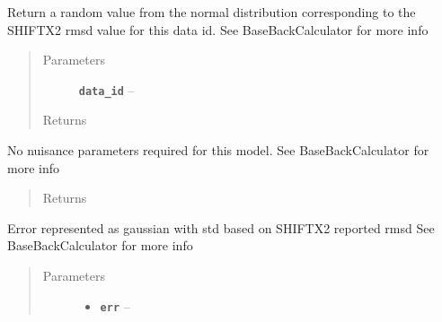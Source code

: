 \documentclass[letterpaper,10pt,english]{sphinxmanual}
\begin{document}
\begin{fulllineitems}

\begin{fulllineitems}
\label{modules:backcalc.ShiftBackCalc.get_random_err}
Return a random value from the normal distribution corresponding
to the SHIFTX2 rmsd value for this data id. See BaseBackCalculator
for more info
\begin{quote}\begin{description}
\item[{Parameters}] \leavevmode
\textbf{\texttt{data\_id}} -- 

\item[{Returns}] \leavevmode


\end{description}\end{quote}

\end{fulllineitems}


\begin{fulllineitems}
\label{modules:backcalc.ShiftBackCalc.get_random_params}
No nuisance parameters required for this model. See BaseBackCalculator
for more info
\begin{quote}\begin{description}
\item[{Returns}] \leavevmode


\end{description}\end{quote}

\end{fulllineitems}


\begin{fulllineitems}
\label{modules:backcalc.ShiftBackCalc.logp_err}
Error represented as gaussian with std based on SHIFTX2 reported rmsd
See BaseBackCalculator for more info
\begin{quote}\begin{description}
\item[{Parameters}] \leavevmode\begin{itemize}
\item {} 
\textbf{\texttt{err}} -- 


\end{itemize}
\end{description}
\end{quote}
\end{fulllineitems}
\end{fulllineitems}
\end{document}

